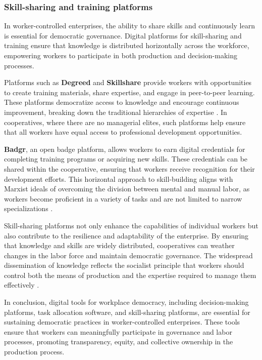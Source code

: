 \begin{refsection}
\subsubsection{Skill-sharing and training platforms}

In worker-controlled enterprises, the ability to share skills and continuously learn is essential for democratic governance. Digital platforms for skill-sharing and training ensure that knowledge is distributed horizontally across the workforce, empowering workers to participate in both production and decision-making processes.

Platforms such as \textbf{Degreed} and \textbf{Skillshare} provide workers with opportunities to create training materials, share expertise, and engage in peer-to-peer learning. These platforms democratize access to knowledge and encourage continuous improvement, breaking down the traditional hierarchies of expertise \cite[pp.~58-60]{mason2015}. In cooperatives, where there are no managerial elites, such platforms help ensure that all workers have equal access to professional development opportunities.

\textbf{Badgr}, an open badge platform, allows workers to earn digital credentials for completing training programs or acquiring new skills. These credentials can be shared within the cooperative, ensuring that workers receive recognition for their development efforts. This horizontal approach to skill-building aligns with Marxist ideals of overcoming the division between mental and manual labor, as workers become proficient in a variety of tasks and are not limited to narrow specializations \cite[pp.~78-82]{kotz2017}.

Skill-sharing platforms not only enhance the capabilities of individual workers but also contribute to the resilience and adaptability of the enterprise. By ensuring that knowledge and skills are widely distributed, cooperatives can weather changes in the labor force and maintain democratic governance. The widespread dissemination of knowledge reflects the socialist principle that workers should control both the means of production and the expertise required to manage them effectively \cite[pp.~101-104]{wright2010}.

In conclusion, digital tools for workplace democracy, including decision-making platforms, task allocation software, and skill-sharing platforms, are essential for sustaining democratic practices in worker-controlled enterprises. These tools ensure that workers can meaningfully participate in governance and labor processes, promoting transparency, equity, and collective ownership in the production process.


\end{refsection}
